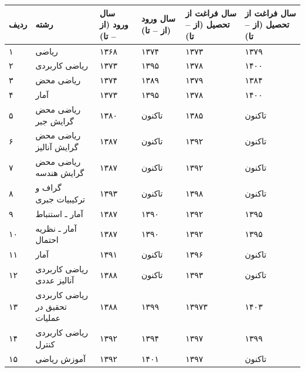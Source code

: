 \documentclass[
  letterpaper,
  DIV=11,
  numbers=noendperiod]{scrreprt}
\newcounter{none} %
\begin{document}
{\def\LTcaptype{none} %
\begin{longtable}[]{@{}
  >{\raggedright\arraybackslash}p{}
  >{\raggedright\arraybackslash}p{}
  >{\raggedright\arraybackslash}p{}
  >{\raggedright\arraybackslash}p{}
  >{\raggedright\arraybackslash}p{}
  >{\raggedright\arraybackslash}p{}@{}}
\toprule\noalign{}
\begin{minipage}[b]{\linewidth}\raggedright
ردیف
\end{minipage} & \begin{minipage}[b]{\linewidth}\raggedright
رشته
\end{minipage} & \begin{minipage}[b]{\linewidth}\raggedright
سال ورود (از -- تا)
\end{minipage} & \begin{minipage}[b]{\linewidth}\raggedright
سال ورود (از -- تا)
\end{minipage} & \begin{minipage}[b]{\linewidth}\raggedright
سال فراغت از تحصیل (از -- تا)
\end{minipage} & \begin{minipage}[b]{\linewidth}\raggedright
سال فراغت از تحصیل (از -- تا)
\end{minipage} \\
\midrule\noalign{}
\endhead
\bottomrule\noalign{}
\endlastfoot
۱ & ریاضی & ۱۳۶۸ & ۱۳۷۴ & ۱۳۷۳ & ۱۳۷۹ \\
۲ & ریاضی کاربردی & ۱۳۷۳ & ۱۳۹۵ & ۱۳۷۸ & ۱۴۰۰ \\
۳ & ریاضی محض & ۱۳۷۴ & ۱۳۸۹ & ۱۳۷۹ & ۱۳۸۴ \\
۴ & آمار & ۱۳۷۳ & ۱۳۹۵ & ۱۳۷۸ & ۱۴۰۰ \\
۵ & ریاضی محض گرایش جبر & ۱۳۸۰ & تاکنون & ۱۳۸۵ & تاکنون \\
۶ & ریاضی محض گرایش آنالیز & ۱۳۸۷ & تاکنون & ۱۳۹۲ & تاکنون \\
۷ & ریاضی محض گرایش هندسه & ۱۳۸۷ & تاکنون & ۱۳۹۲ & تاکنون \\
۸ & گراف و ترکیبیات جبری & ۱۳۹۳ & تاکنون & ۱۳۹۸ & تاکنون \\
۹ & آمار ـ استنباط & ۱۳۸۷ & ۱۳۹۰ & ۱۳۹۲ & ۱۳۹۵ \\
۱۰ & آمار ـ نظریه احتمال & ۱۳۸۷ & ۱۳۹۰ & ۱۳۹۲ & ۱۳۹۵ \\
۱۱ & آمار & ۱۳۹۱ & تاکنون & ۱۳۹۶ & تاکنون \\
۱۲ & ریاضی کاربردی آنالیز عددی & ۱۳۸۸ & تاکنون & ۱۳۹۳ & تاکنون \\
۱۳ & ریاضی کاربردی تحقیق در عملیات & ۱۳۸۸ & ۱۳۹۹ & ۱۳۹۷۳ & ۱۴۰۳ \\
۱۴ & ریاضی کاربردی کنترل & ۱۳۹۲ & ۱۳۹۴ & ۱۳۹۷ & ۱۳۹۹ \\
۱۵ & آموزش ریاضی & ۱۳۹۲ & ۱۴۰۱ & ۱۳۹۷ & تاکنون \\
\end{longtable}
}
\end{document}
